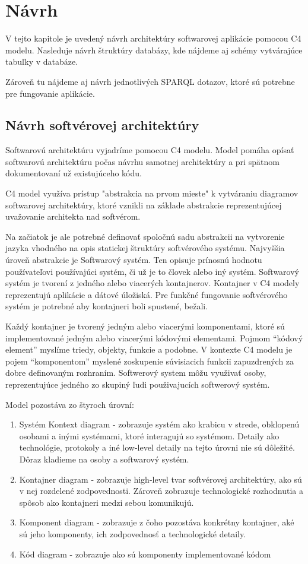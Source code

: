 \chapter{Návrh}
V tejto kapitole je uvedený návrh architektúry softwarovej aplikácie pomocou C4 modelu.
Nasleduje návrh štruktúry databázy, kde nájdeme aj schémy vytvárajúce tabuľky v databáze. 

Zároveň tu nájdeme aj návrh jednotlivých SPARQL dotazov, ktoré sú potrebne pre fungovanie aplikácie. 

\section{Návrh softvérovej architektúry}

Softwarovú architektúru vyjadríme pomocou C4 modelu. Model pomáha opísať softwarovú architektúru počas
návrhu samotnej architektúry a pri spätnom dokumentovaní už existujúceho kódu.

C4 model využíva prístup "abstrakcia na prvom mieste" k vytváraniu diagramov softwarovej architektúry, ktoré vznikli na základe
abstrakcie reprezentujúcej uvažovanie architekta nad softvérom.

Na začiatok je ale potrebné definovať spoločnú sadu abstrakcii na vytvorenie jazyka vhodného na opis statickej štruktúry softvérového systému.
Najvyššia úroveň abstrakcie je Softwarový systém. Ten opisuje prínosnú hodnotu používateľovi používajúci systém, či už je to človek alebo iný systém.
Softwarový systém je tvorení z jedného alebo viacerých kontajnerov. Kontajner v C4 modely reprezentujú aplikácie a dátové úložiská.
Pre funkčné fungovanie softvérového systém je potrebné aby kontajneri boli spustené, bežali.

Každý kontajner je tvorený jedným alebo viacerými komponentami, ktoré sú implementované jedným alebo viacerými kódovými elementami. Pojmom “kódový element” myslíme
triedy, objekty, funkcie a podobne. V kontexte C4 modelu je pojem “komponentom” myslené zoskupenie súvisiacich funkcii zapuzdrených za dobre definovaným rozhraním.
Softwerový system môžu využivať osoby, reprezentujúce jedného zo skupiný ľudi použivajucích softwerový systém.

Model pozostáva zo štyroch úrovní:
\begin{enumerate}
      \item Systém Kontext diagram - zobrazuje systém ako krabicu v strede, obklopenú osobami a inými systémami, ktoré interagujú so systémom.
            Detaily ako technológie, protokoly a iné low-level detaily na tejto úrovni nie sú dôležité. Dôraz kladieme na osoby a softwarový systém.
      \item Kontajner diagram - zobrazuje high-level tvar softvérovej architektúry, ako sú v nej rozdelené zodpovednosti. Zároveň zobrazuje technologické rozhodnutia a
            spôsob ako kontajneri medzi sebou komunikujú.
      \item Komponent diagram - zobrazuje z čoho pozostáva konkrétny kontajner, aké sú jeho komponenty, ich zodpovednosť a technologické detaily.
      \item Kód diagram - zobrazuje ako sú komponenty implementované kódom
\end{enumerate}

